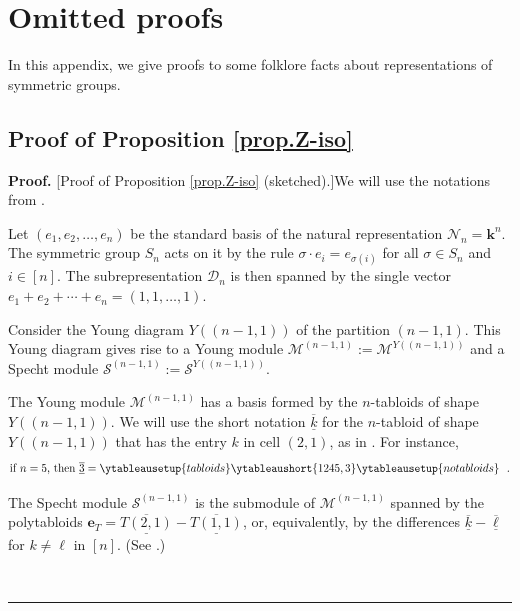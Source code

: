 \documentclass[numbers=enddot,12pt,final,onecolumn,notitlepage]{scrartcl}%
\theoremstyle{definition}
\newenvironment{proof}[1][Proof]{\noindent\textbf{#1.} }{\ \rule{0.5em}{0.5em}}
\begin{document}
\appendix



\section{\label{sec.apx.proofs}Omitted proofs}

In this appendix, we give proofs to some folklore facts about representations
of symmetric groups.

\subsection{\label{subsec.apx.pf.prop.Z-iso}Proof of Proposition
\ref{prop.Z-iso}}

\begin{proof}
[Proof of Proposition \ref{prop.Z-iso} (sketched).]We will use the notations
from \cite{sga}.

Let $\left(  e_{1},e_{2},\ldots,e_{n}\right)  $ be the standard basis of the
natural representation $\mathcal{N}_{n}=\mathbf{k}^{n}$. The symmetric group
$S_{n}$ acts on it by the rule $\sigma\cdot e_{i}=e_{\sigma\left(  i\right)
}$ for all $\sigma\in S_{n}$ and $i\in\left[  n\right]  $. The
subrepresentation $\mathcal{D}_{n}$ is then spanned by the single vector
$e_{1}+e_{2}+\cdots+e_{n}=\left(  1,1,\ldots,1\right)  $.

Consider the Young diagram $Y\left(  \left(  n-1,1\right)  \right)  $ of the
partition $\left(  n-1,1\right)  $. This Young diagram gives rise to a Young
module $\mathcal{M}^{\left(  n-1,1\right)  }:=\mathcal{M}^{Y\left(  \left(
n-1,1\right)  \right)  }$ and a Specht module $\mathcal{S}^{\left(
n-1,1\right)  }:=\mathcal{S}^{Y\left(  \left(  n-1,1\right)  \right)  }$.

The Young module $\mathcal{M}^{\left(  n-1,1\right)  }$ has a basis formed by
the $n$-tabloids of shape $Y\left(  \left(  n-1,1\right)  \right)  $. We will
use the short notation $\underline{\overline{k}}$ for the $n$-tabloid of shape
$Y\left(  \left(  n-1,1\right)  \right)  $ that has the entry $k$ in cell
$\left(  2,1\right)  $, as in \cite[Example 5.3.16]{sga}. For instance,%
\[
\text{if }n=5\text{, then }\underline{\overline{3}}%
=\ytableausetup{tabloids}\ytableaushort{1245,3}\ytableausetup{notabloids}\ \ .
\]


The Specht module $\mathcal{S}^{\left(  n-1,1\right)  }$ is the submodule of
$\mathcal{M}^{\left(  n-1,1\right)  }$ spanned by the polytabloids
$\mathbf{e}_{T}=\underline{\overline{T\left(  2,1\right)  }}%
-\underline{\overline{T\left(  1,1\right)  }}$, or, equivalently, by the
differences $\underline{\overline{k}}-\underline{\overline{\ell}}$ for
$k\neq\ell$ in $\left[  n\right]  $. (See \cite[Example 5.4.2]{sga}.)


\end{proof}
\end{document}

